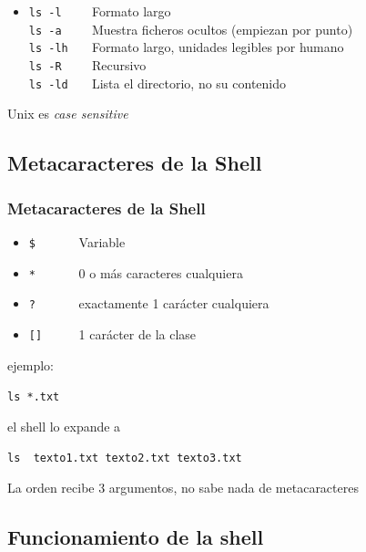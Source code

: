 \documentclass[ucs]{beamer}
\begin{document}
\begin{frame}[fragile]
\begin{itemize} 
\item 

\verb|ls -l    |   Formato largo\\
\verb|ls -a    |   Muestra ficheros ocultos (empiezan por punto)\\
\verb|ls -lh   |   Formato largo, unidades legibles por humano \\
\verb|ls -R    |   Recursivo\\
\verb|ls -ld   |   Lista el directorio, no su contenido\\


\end{itemize}
Unix es \emph{case sensitive}
\end{frame}


\subsection{Metacaracteres de la Shell}
\begin{frame}[fragile]
\frametitle{Metacaracteres de la Shell}
\begin{itemize} 
\item 
\verb|$      |
Variable 
\item 
\verb|*      |
0 o más caracteres cualquiera
\item 
\verb|?      |
exactamente 1 carácter cualquiera
\item 
\verb|[]     |
1 carácter de la clase
\end{itemize}

ejemplo:

\verb|ls *.txt|

el shell lo expande a 

\verb|ls  texto1.txt texto2.txt texto3.txt|

La orden recibe 3 argumentos, no sabe nada de metacaracteres

\end{frame}


\subsection{Funcionamiento de la shell}
\end{document}
